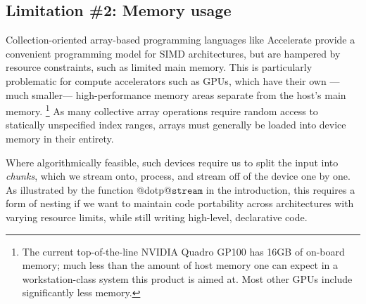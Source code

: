 %
%
%

\subsection{Limitation \#2: Memory usage}
\label{sec:problem_2}

Collection-oriented array-based programming languages like Accelerate
provide a convenient programming model for SIMD architectures, but are hampered by resource constraints, such as limited main memory. This is particularly problematic for compute
accelerators such as GPUs, which have their own ---much
smaller--- high-performance memory areas separate from the host's main memory.%
\footnote{The current top-of-the-line NVIDIA Quadro GP100 has 16GB of on-board
memory; much less than the amount of host memory one can expect in a
workstation-class system this product is aimed at. Most other GPUs include significantly less memory.}
As many collective array operations require random access to statically unspecified index ranges, arrays must generally be loaded into device memory in their entirety.

Where algorithmically feasible, such devices require us to split the input into \emph{chunks}, which we stream onto, process, and stream off of the device one by one. As illustrated by the function @dotp@$\texttt{stream}$ in the introduction, this requires a form of nesting if we want to maintain code portability across architectures with varying resource limits, while still writing high-level, declarative code.

%

